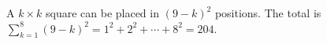A $k\times k$ square can be placed in $(9-k)^2$ positions. The total is $\sum_{k=1}^8(9-k)^2=1^2+2^2+\cdots+8^2=\boxed{204}$.
